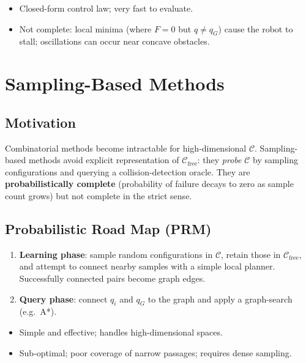\documentclass[11pt,a4paper]{article}
\theoremstyle{definition}
\theoremstyle{plain}
\theoremstyle{remark}
\begin{document}
\begin{itemize}
    \item[\textbf{+}] Closed-form control law; very fast to evaluate.
    \item[\textbf{--}] Not complete: local minima (where $F = 0$ but $q \neq q_G$) cause the robot to stall; oscillations can occur near concave obstacles.
\end{itemize}

\section{Sampling-Based Methods}

\subsection{Motivation}

Combinatorial methods become intractable for high-dimensional $\mathcal{C}$. Sampling-based methods avoid explicit representation of $\mathcal{C}_{\mathrm{free}}$: they \emph{probe} $\mathcal{C}$ by sampling configurations and querying a collision-detection oracle. They are \textbf{probabilistically complete} (probability of failure decays to zero as sample count grows) but not complete in the strict sense.

\subsection{Probabilistic Road Map (PRM)}

\begin{enumerate}
    \item \textbf{Learning phase}: sample random configurations in $\mathcal{C}$, retain those in $\mathcal{C}_{\mathrm{free}}$, and attempt to connect nearby samples with a simple local planner. Successfully connected pairs become graph edges.
    \item \textbf{Query phase}: connect $q_i$ and $q_G$ to the graph and apply a graph-search (e.g.\ A*).
\end{enumerate}

\begin{itemize}
    \item[\textbf{+}] Simple and effective; handles high-dimensional spaces.
    \item[\textbf{--}] Sub-optimal; poor coverage of narrow passages; requires dense sampling.
\end{itemize}
\end{document}
